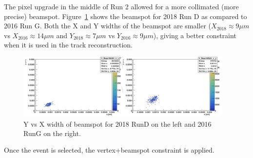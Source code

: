 The pixel upgrade in the middle of Run 2 allowed for a more collimated (more precise) \pp beamspot.
Figure~\ref{fig:BeamY_vs_Y} shows the beamspot for 2018 Run D as compared to 2016 Run G.
Both the X and Y widths of the beamspot are smaller ($X_{2018} \approx 9 \mu m$ vs $X_{2016} \approx 14 \mu m$ and $Y_{2018} \approx 7 \mu m$ vs $Y_{2016} \approx 9 \mu m$), giving a better constraint when it is used in the track reconstruction.
\begin{figure}[!htbp]
\begin{center}
	\includegraphics[width=0.96\textwidth]{figures/higgsmassmeas/vxbs/beamspot_width_2016RunG_vs_2018RunD.png}
	\caption{Y vs X width of beamspot for 2018 RunD on the left and 2016 RunG on the right.}
\label{fig:BeamY_vs_Y}
\end{center}
\end{figure}
Once the event is selected, the vertex+beamspot constraint is applied.

